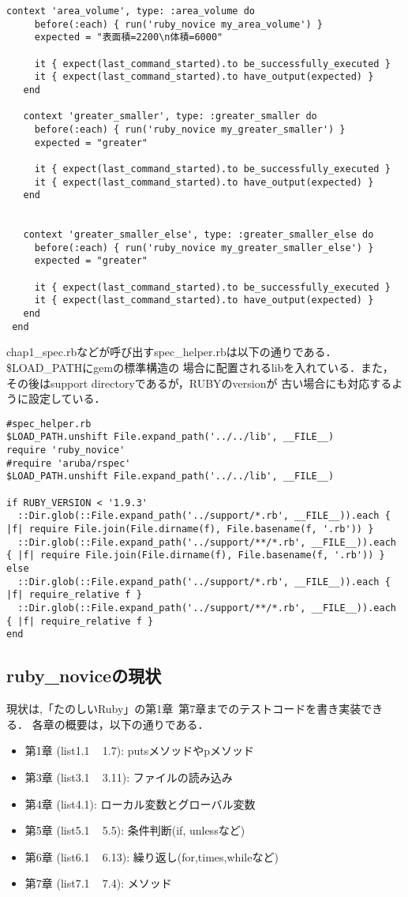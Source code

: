 \begin{lstlisting}[style=customRuby,basicstyle={\scriptsize\ttfamily}]
   context 'area_volume', type: :area_volume do
     before(:each) { run('ruby_novice my_area_volume') }
     expected = "表面積=2200\n体積=6000"
 
     it { expect(last_command_started).to be_successfully_executed }
     it { expect(last_command_started).to have_output(expected) }
   end
 
   context 'greater_smaller', type: :greater_smaller do
     before(:each) { run('ruby_novice my_greater_smaller') }
     expected = "greater"
 
     it { expect(last_command_started).to be_successfully_executed }
     it { expect(last_command_started).to have_output(expected) }
   end
 
 
   context 'greater_smaller_else', type: :greater_smaller_else do
     before(:each) { run('ruby_novice my_greater_smaller_else') }
     expected = "greater"
 
     it { expect(last_command_started).to be_successfully_executed }
     it { expect(last_command_started).to have_output(expected) }
   end
 end
\end{lstlisting}
chap1\_spec.rbなどが呼び出すspec\_helper.rbは以下の通りである．\$LOAD\_PATHにgemの標準構造の
場合に配置されるlibを入れている．また，その後はsupport directoryであるが，RUBYのversionが
古い場合にも対応するように設定している．
\begin{lstlisting}[style=customRuby,basicstyle={\scriptsize\ttfamily}]
#spec_helper.rb
$LOAD_PATH.unshift File.expand_path('../../lib', __FILE__)
require 'ruby_novice'
#require 'aruba/rspec'
$LOAD_PATH.unshift File.expand_path('../../lib', __FILE__)

if RUBY_VERSION < '1.9.3'
  ::Dir.glob(::File.expand_path('../support/*.rb', __FILE__)).each { |f| require File.join(File.dirname(f), File.basename(f, '.rb')) }
  ::Dir.glob(::File.expand_path('../support/**/*.rb', __FILE__)).each { |f| require File.join(File.dirname(f), File.basename(f, '.rb')) }
else
  ::Dir.glob(::File.expand_path('../support/*.rb', __FILE__)).each { |f| require_relative f }
  ::Dir.glob(::File.expand_path('../support/**/*.rb', __FILE__)).each { |f| require_relative f }
end
\end{lstlisting}
\subsection{ruby\_noviceの現状}
現状は,「たのしいRuby」の第1章~第7章までのテストコードを書き実装できる．
各章の概要は，以下の通りである．

\begin{itemize}
\item 第1章 (list1.1 ~ 1.7):  putsメソッドやpメソッド
\item 第3章 (list3.1 ~ 3.11): ファイルの読み込み
\item 第4章 (list4.1):        ローカル変数とグローバル変数
\item 第5章 (list5.1 ~ 5.5):  条件判断(if, unlessなど)
\item 第6章 (list6.1 ~ 6.13): 繰り返し(for,times,whileなど)
\item 第7章 (list7.1 ~ 7.4):  メソッド
\end{itemize}
